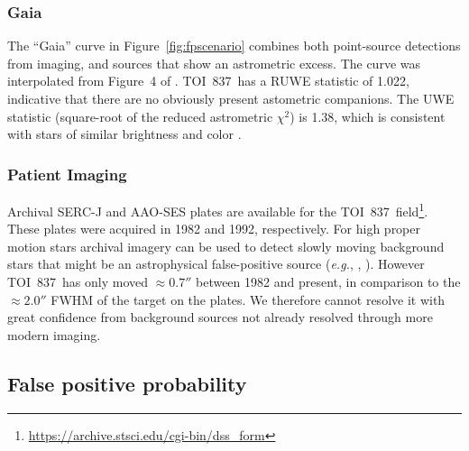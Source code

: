 \documentclass[12pt,twocolumn,tighten]{aastex63}
\newcommand{\tn}{TOI~837} %
\begin{document}
\subsubsection{Gaia}

The ``Gaia'' curve in Figure~\ref{fig:fpscenario} combines both
point-source detections from imaging, and sources that show an
astrometric excess.  The curve was interpolated from Figure~4 of
\citet{rizzuto_zeitVIII_2018}.  \tn\ has a RUWE statistic of 1.022,
indicative that there are no obviously present astometric companions.
The UWE statistic (square-root of the reduced astrometric $\chi^2$) is
1.38, which is consistent with stars of similar brightness and color
\citep[][Appendix A]{lindegren_gaiasoln_2018}.

%


\subsubsection{Patient Imaging}

Archival SERC-J and AAO-SES plates are available for the \tn\
field\footnote{\url{https://archive.stsci.edu/cgi-bin/dss_form}}.
These plates were acquired in 1982 and 1992, respectively.  For high
proper motion stars archival imagery can be used to detect slowly
moving background stars that might be an astrophysical false-positive
source ({\it e.g.}, \citealt{huang_pimen_2018},
\citealt{vanderburg_hr858_2019}).  However \tn\ has only moved
$\approx0.7''$ between 1982 and present, in comparison to the
$\approx2.0''$ FWHM of the target on the plates.  We therefore cannot
resolve it with great confidence from background sources not already
resolved through more modern imaging.


\subsection{False positive probability}
\end{document}

